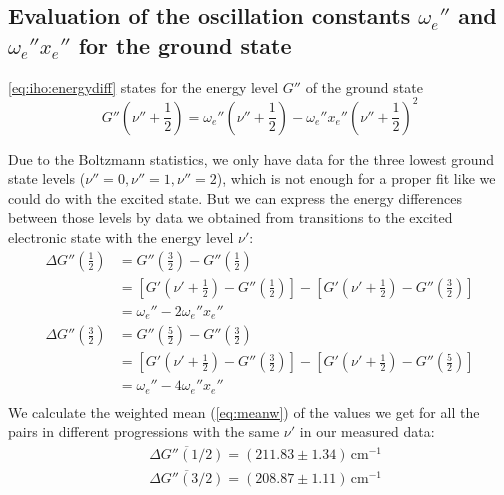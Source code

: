 \subsection{Evaluation of the oscillation constants $\omega_e''$ and $\omega_e'' x_e''$ for the ground state}

\autoref{eq:iho:energydiff} states for the energy level $G''$ of the ground state
\begin{equation}
  G'' \left( \nu''+\frac{1}{2} \right) = \omega_e'' \left( \nu'' + \frac{1}{2} \right) - \omega_e'' x_e'' \left( \nu'' + \frac{1}{2} \right)^2 
\end{equation}

Due to the Boltzmann statistics, we only have data for the three lowest ground state levels
($\nu''=0,\nu''=1,\nu''=2$), which is
not enough for a proper fit like we could do with the excited state.
But we can express the energy differences between those levels by data we obtained from transitions
to the excited electronic state with the energy level $\nu'$:
\begin{equation}
\begin{split}
  \Delta G''\left( \frac{1}{2}\right)  &  =
   G''\left( \frac{3}{2}\right)-G''\left( \frac{1}{2}\right)   \\
 & = \left[G'\left(\nu'+\frac{1}{2}\right)-G''\left(\frac{1}{2}\right)\right]-
\left[G'\left(\nu'+\frac{1}{2}\right)-G''\left(\frac{3}{2}\right)\right]\\
& = \omega_e''-2\omega_e''x_e''\\
  \Delta G''\left( \frac{3}{2}\right)  &  =
   G''\left( \frac{5}{2}\right)-G''\left( \frac{3}{2}\right)\\
   & = \left[G'\left(\nu'+\frac{1}{2}\right)-G''\left(\frac{3}{2}\right)\right]-
\left[G'\left(\nu'+\frac{1}{2}\right)-G''\left(\frac{5}{2}\right)\right]\\
& = \omega_e''-4\omega_e''x_e''\\
  \end{split}
\end{equation}
We calculate the weighted mean (\autoref{eq:meanw}) of the values
we get for all the pairs in different progressions
with the same $\nu'$ in our measured data:
\begin{equation}
\begin{split}
 & \overline{\Delta G''(1/2)}= (211.83 \pm 1.34)\,\text{cm}^{-1}\\
 & \overline{\Delta G''(3/2)}= (208.87 \pm 1.11)\,\text{cm}^{-1}
 \end{split}
\end{equation}


